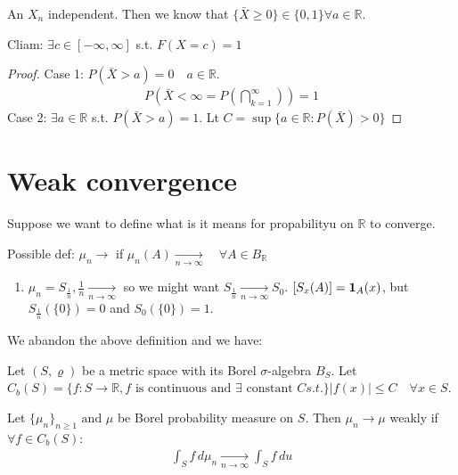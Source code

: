 \documentclass[11pt]{article}
\begin{document}
\begin{example}
    An $X_n$ independent. Then we know that $\{ \bar{X} \ge 0 \} \in \{ 0,1 \} \forall a\in \mathbb{R}$.

    Cliam: $\exists c \in [-\infty,\infty]$ s.t.
    $F(X = c) = 1$
    \begin{proof}
        Case 1: $P(\bar{X} > a) = 0 \quad a \in \mathbb{R}$.
        \begin{align*}
            P(\bar{X} < \infty = P(\bigcap _{k=1}^{\infty})) = 1
        \end{align*}
        Case 2: $\exists  a\in \mathbb{R}$ s.t. $P(\bar{X} > a) = 1$.
        Lt $C = \sup\{a \in \mathbb{R}: P(\bar{X} ) > 0  \}$
    \end{proof}
\end{example}

\section{Weak convergence}
Suppose we want to define what is it means for propabilityu on $\mathbb{R}   $ to converge.

Possible def: $\mu_{n} \to $ if $\mu_{n}(A) \underset{n \to \infty}{\longrightarrow} \quad \forall  A \in B _{\mathbb{R}}$
\begin{example}
    \begin{enumerate}
        \item $\mu_{n} = S_{\frac{1}{n}}, \frac{1}{n} \underset{n \to \infty}{\longrightarrow}$ 
        so we might want $S_{\frac{1}{n} } \underset{n \to \infty}{\longrightarrow} S_0$. 
        $[S_{x}(A)] = \bm{1}_{A}(x)$, but $S_{\frac{1}{n}}(\{ 0 \}) = 0$ and $S_{0}(\{ 0 \}) = 1$.
    \end{enumerate}
\end{example}

We abandon the above definition and we have:
\begin{definition}
    Let $(S, \varrho)$ be a metric space with its Borel $\sigma$-algebra $B_{S}$. Let 
    $C_{b}(S) = \{ f: S \to \mathbb{R}, f\text{ is continuous and }\exists 
    \text{ constant }C s.t. \} |f(x)| \le C \quad \forall  x \in S$.

    Let $\{ \mu_n \}_{n \ge 1} \text{ and } \mu$ be Borel probability measure on $S$. Then 
    $\mu_n \longrightarrow \mu$ weakly if $\forall f \in C_{b}(S)$:
    \begin{align*}
        \int_{S}f \, d \mu_{n} \underset{n \to \infty}{\longrightarrow} \int_{S}f \, du
    \end{align*}
\end{definition}
\end{document}
